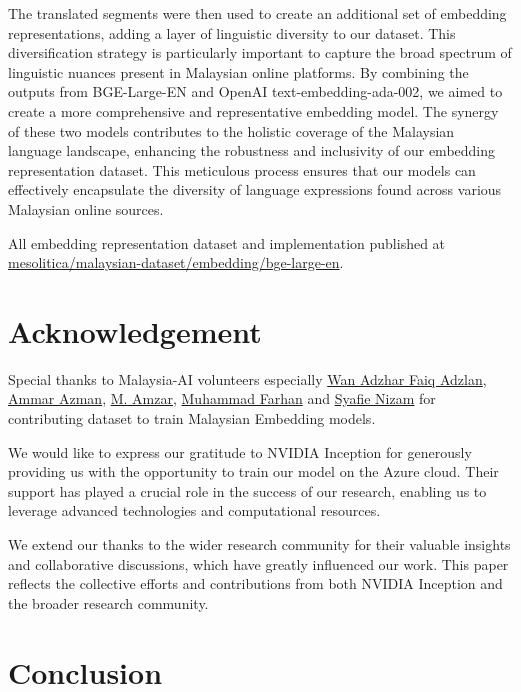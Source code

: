 \documentclass[preprint]{article}
\begin{document}
The translated segments were then used to create an additional set of embedding representations, adding a layer of linguistic diversity to our dataset. This diversification strategy is particularly important to capture the broad spectrum of linguistic nuances present in Malaysian online platforms. By combining the outputs from BGE-Large-EN and OpenAI text-embedding-ada-002, we aimed to create a more comprehensive and representative embedding model. The synergy of these two models contributes to the holistic coverage of the Malaysian language landscape, enhancing the robustness and inclusivity of our embedding representation dataset. This meticulous process ensures that our models can effectively encapsulate the diversity of language expressions found across various Malaysian online sources.

All embedding representation dataset and implementation published at \href{https://github.com/mesolitica/malaysian-dataset/tree/master/embedding/bge-large-en}{mesolitica/malaysian-dataset/embedding/bge-large-en}.

\section{Acknowledgement}

Special thanks to Malaysia-AI volunteers especially \href{https://www.linkedin.com/in/wan-adzhar-faiq-adzlan-19a27baa/}{Wan Adzhar Faiq Adzlan}, \href{https://www.linkedin.com/in/ammar-azman/}{Ammar Azman}, \href{https://www.linkedin.com/in/amzar96/}{M. Amzar}, \href{https://www.linkedin.com/in/muhammad-farhan-helmy-0529501a7/}{Muhammad Farhan} and \href{https://www.linkedin.com/in/syafie-nizam/}{Syafie Nizam} for contributing dataset to train Malaysian Embedding models.

We would like to express our gratitude to NVIDIA Inception for generously providing us with the opportunity to train our model on the Azure cloud. Their support has played a crucial role in the success of our research, enabling us to leverage advanced technologies and computational resources.

We extend our thanks to the wider research community for their valuable insights and collaborative discussions, which have greatly influenced our work. This paper reflects the collective efforts and contributions from both NVIDIA Inception and the broader research community.

\section{Conclusion}
\end{document}
